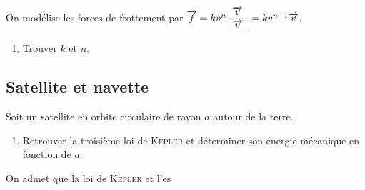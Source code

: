 \documentclass[a4paper,french,bookmarks]{article}
\begin{document}
    On modélise les forces de frottement par $\overrightarrow{f} = k v^n \dfrac{\overrightarrow{v}}{\left\lVert\overrightarrow{v}\right\rVert} = kv^{n-1} \overrightarrow{v}$. 

    \begin{enumerate}[resume]
        \item Trouver $k$ et $n$.
    \end{enumerate}

    \subsection{Satellite et navette}

    Soit un satellite en orbite circulaire de rayon $a$ autour de la terre. 
    
    \begin{enumerate}
        \item Retrouver la troisième loi de \textsc{Kepler} et déterminer son énergie mécanique en fonction de $a$.


        
    \end{enumerate} On admet que la loi de \textsc{Kepler} et l'es

    

    
\end{document}
